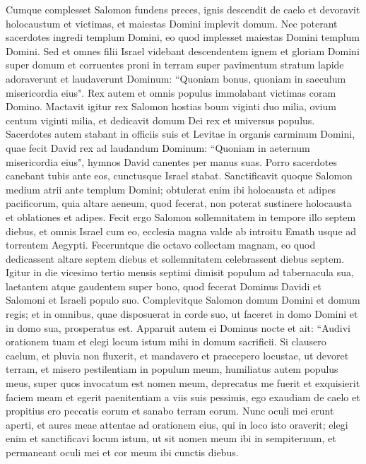 \begin{biblechapter}  
\verse Cumque complesset Salomon fundens preces, ignis descendit de caelo et devoravit holocaustum et victimas, et maiestas Domini implevit domum. 
\verse Nec poterant sacerdotes ingredi templum Domini, eo quod implesset maiestas Domini templum Domini. 
\verse Sed et omnes filii Israel videbant descendentem ignem et gloriam Domini super domum et corruentes proni in terram super pavimentum stratum lapide adoraverunt et laudaverunt Dominum: “Quoniam bonus, quoniam in saeculum misericordia eius". 
\verse Rex autem et omnis populus immolabant victimas coram Domino. 
\verse Mactavit igitur rex Salomon hostias boum viginti duo milia, ovium centum viginti milia, et dedicavit domum Dei rex et universus populus. 
\verse Sacerdotes autem stabant in officiis suis et Levitae in organis carminum Domini, quae fecit David rex ad laudandum Dominum: “Quoniam in aeternum misericordia eius", hymnos David canentes per manus suas. Porro sacerdotes canebant tubis ante eos, cunctusque Israel stabat. 
\verse Sanctificavit quoque Salomon medium atrii ante templum Domini; obtulerat enim ibi holocausta et adipes pacificorum, quia altare aeneum, quod fecerat, non poterat sustinere holocausta et oblationes et adipes. 
\verse Fecit ergo Salomon sollemnitatem in tempore illo septem diebus, et omnis Israel cum eo, ecclesia magna valde ab introitu Emath usque ad torrentem Aegypti. 
\verse Feceruntque die octavo collectam magnam, eo quod dedicassent altare septem diebus et sollemnitatem celebrassent diebus septem. 
\verse Igitur in die vicesimo tertio mensis septimi dimisit populum ad tabernacula sua, laetantem atque gaudentem super bono, quod fecerat Dominus Davidi et Salomoni et Israeli populo suo. 
\verse Complevitque Salomon domum Domini et domum regis; et in omnibus, quae disposuerat in corde suo, ut faceret in domo Domini et in domo sua, prosperatus est. 
\verse Apparuit autem ei Dominus nocte et ait: “Audivi orationem tuam et elegi locum istum mihi in domum sacrificii. 
\verse Si clausero caelum, et pluvia non fluxerit, et mandavero et praecepero locustae, ut devoret terram, et misero pestilentiam in populum meum, 
\verse humiliatus autem populus meus, super quos invocatum est nomen meum, deprecatus me fuerit et exquisierit faciem meam et egerit paenitentiam a viis suis pessimis, ego exaudiam de caelo et propitius ero peccatis eorum et sanabo terram eorum. 
\verse Nunc oculi mei erunt aperti, et aures meae attentae ad orationem eius, qui in loco isto oraverit; 
\verse elegi enim et sanctificavi locum istum, ut sit nomen meum ibi in sempiternum, et permaneant oculi mei et cor meum ibi cunctis diebus. 

\end{biblechapter}
